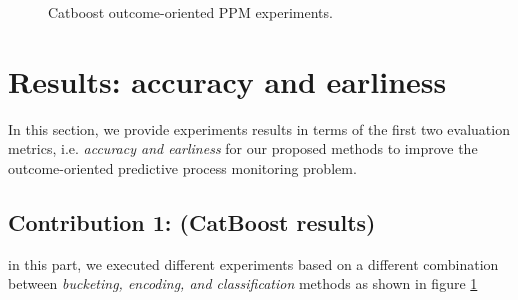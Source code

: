 \begin{figure}[!htbp]
	\begin{center}
		\caption[CatBoost experiments]{Catboost outcome-oriented PPM experiments. }
		\label{fig:cate}
	\end{center}
\end{figure}


\section{Results: accuracy and earliness}
In this section, we provide experiments results in terms of the first two evaluation metrics, i.e. \textit{accuracy and earliness} for our proposed methods to improve the outcome-oriented predictive process monitoring problem.

\subsection{Contribution 1: (CatBoost results)} \label{catresult}
in this part, we executed different experiments based on a different combination between \textit{bucketing, encoding, and classification} methods as shown in figure \ref{fig:cate}

















